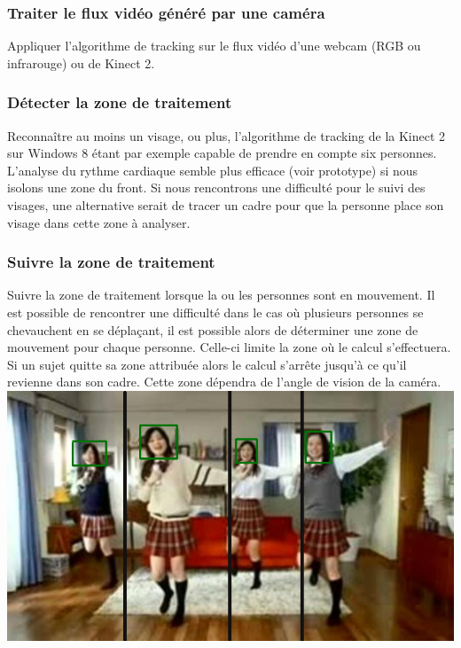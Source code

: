 \documentclass[12pt,a4paper]{article}
\begin{document}
\subsubsection{Traiter le flux vidéo généré par une caméra}

Appliquer l'algorithme de tracking sur le flux vidéo d'une webcam (RGB ou infrarouge) ou de Kinect 2.

\subsubsection{Détecter la zone de traitement}

Reconnaître au moins un visage, ou plus, l'algorithme de tracking de la Kinect 2 sur Windows 8 étant par exemple capable de prendre en compte six personnes.
L'analyse du rythme cardiaque semble plus efficace (voir prototype) si nous isolons une zone du front.
Si nous rencontrons une difficulté pour le suivi des visages, une alternative serait de tracer un cadre pour que la personne place son visage dans cette zone à analyser.

\subsubsection{Suivre la zone de traitement}

Suivre la zone de traitement lorsque la ou les personnes sont en mouvement. Il est possible de rencontrer une difficulté dans le cas où plusieurs personnes se chevauchent en se déplaçant, il est possible alors de déterminer une zone de mouvement pour chaque personne. Celle-ci limite la zone où le calcul s'effectuera. Si un sujet quitte sa zone attribuée alors le calcul s'arrête jusqu'à ce qu'il revienne dans son cadre.  Cette zone dépendra de l'angle de vision de la caméra.\\

\includegraphics[scale=0.60]{zone_mouvement.png}
\end{document}
